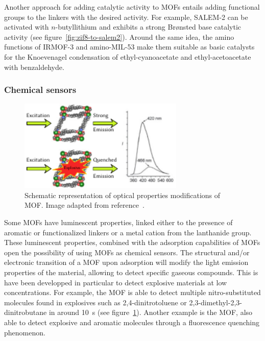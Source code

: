 \documentclass[thesis]{subfiles}
\begin{document}
Another approach for adding catalytic activity to MOFs entails adding functional
groups to the linkers with the desired activity. For example, SALEM-2 can be
activated with $n$-butyllithium and exhibits a strong Brønsted base catalytic
activity\cite{Karagiaridi2012} (see figure~\ref{fig:zif8-to-salem2}). Around
the same idea, the amino functions of IRMOF-3 and amino-MIL-53 make them
suitable as basic catalysts for the Knoevenagel condensation of
ethyl-cyanoacetate and ethyl-acetoacetate with benzaldehyde\cite{Gascon2009}.

\subsubsection{Chemical sensors}

\begin{figure}[ht]
    \centering
    \includegraphics[width=0.7\textwidth]{figures/cited/chemical-sensor}
    \caption{Schematic representation of optical properties modifications of
     MOF. Image adapted from reference~\cite{Lan2009}.}
    \label{fig:chemical-sensor}
\end{figure}

Some MOFs have luminescent properties, linked either to the presence of aromatic
or functionalized linkers or a metal cation from the lanthanide group. These
luminescent properties, combined with the adsorption capabilities of MOFs open
the possibility of using MOFs as chemical sensors. The structural and/or
electronic transition of a MOF upon adsorption will modify the light emission
properties of the material, allowing to detect specific gaseous compounds. This
is have been developped in particular to detect explosive materials at low
concentrations. For example, the  MOF is able to detect
multiple nitro-substituted molecules found in explosives such as
2,4-dinitrotoluene or 2,3-dimethyl-2,3-dinitrobutane in around
\SI{10}{s}\cite{Lan2009} (see figure~\ref{fig:chemical-sensor}). Another example
is the  MOF, also able to detect explosive and aromatic
molecules through a fluorescence quenching phenomenon\cite{Pramanik2011}.
\end{document}
